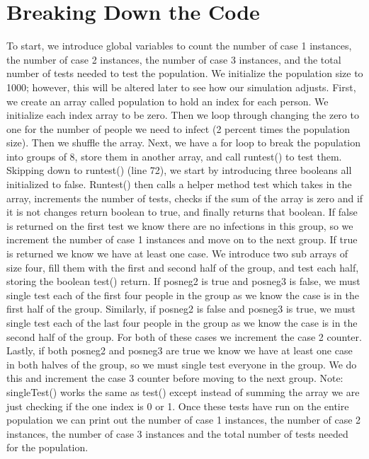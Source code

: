 \documentclass{article}
\begin{document}
\section{Breaking Down the Code}
\large
To start, we introduce global variables to count the number of case 1 instances, the number of case 2 instances, the number of case 3 instances, and the total number of tests needed to test the population. We initialize the population size to 1000; however, this will be altered later to see how our simulation adjusts. First, we create an array called population to hold an index for each person. We initialize each index array to be zero. Then we loop through changing the zero to one for the number of people we need to infect (2 percent times the population size). Then we shuffle the array. Next, we have a for loop to break the population into groups of 8, store them in another array, and call runtest() to test them. Skipping down to runtest() (line 72), we start by introducing three booleans all initialized to false. Runtest() then calls a helper method test which takes in the array, increments the number of tests, checks if the sum of the array is zero and if it is not changes return boolean to true, and finally returns that boolean. If false is returned on the first test we know there are no infections in this group, so we increment the number of case 1 instances and move on to the next group. If true is returned we know we have at least one case. We introduce two sub arrays of size four, fill them with the first and second half of the group, and test each half, storing the boolean test() return. If posneg2 is true and posneg3 is false, we must single test each of the first four people in the group as we know the case is in the first half of the group. Similarly, if posneg2 is false and posneg3 is true, we must single test each of the last four people in the group as we know the case is in the second half of the group. For both of these cases we increment the case 2 counter. Lastly, if both posneg2 and posneg3 are true we know we have at least one case in both halves of the group, so we must single test everyone in the group. We do this and increment the case 3 counter before moving to the next group. Note: singleTest() works the same as test() except instead of summing the array we are just checking if the one index is 0 or 1. Once these tests have run on the entire population we can print out the number of case 1 instances, the number of case 2 instances, the number of case 3 instances and the total number of tests needed for the population. 
\end{document}
